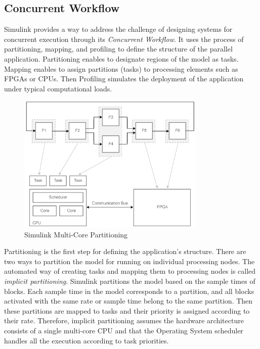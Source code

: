 \subsection{Concurrent Workflow}
Simulink provides a way to address the challenge of designing systems for concurrent execution through its \emph{Concurrent Workflow}. It uses the process of partitioning, mapping, and profiling to define the structure of the parallel application.
Partitioning enables to designate regions of the model as tasks. Mapping enables to assign partitions (tasks) to processing elements such as FPGAs or CPUs. Then Profiling simulates the deployment of the application under typical computational loads.
\begin{figure}[htbp] 
\centering    
\includegraphics[width=0.8\textwidth]{SimulinkConcurrentWorkflow.png}
\caption{Simulink Multi-Core Partitioning}
\label{fig:SimulinkTaskPartitioning}
\end{figure}
\par Partitioning is the first step for defining the application's structure. There are two ways to partition the model for running on individual processing nodes.
The automated way of creating tasks and mapping them to processing nodes is called \emph{implicit partitioning}. Simulink partitions the model based on the sample times of blocks. Each sample time in the model corresponds to a partition, and all blocks activated with the same rate or sample time belong to the same partition. Then these partitions are mapped to tasks and their priority is assigned according to their rate. Therefore, implicit partitioning assumes the hardware architecture consists of a single multi-core CPU and that the Operating System scheduler handles all the execution according to task priorities.
